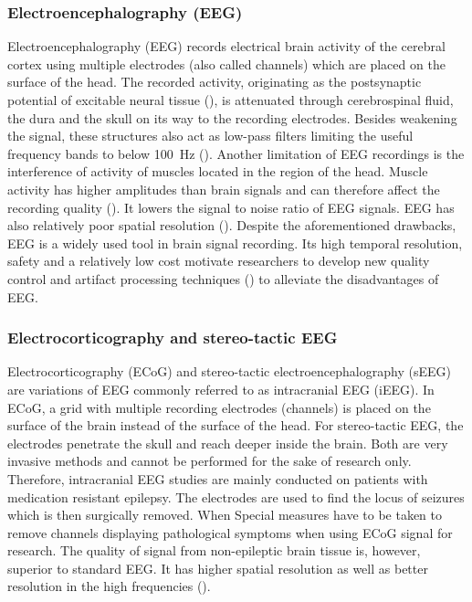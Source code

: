 \subsubsection{Electroencephalography (EEG)}
Electroencephalography (EEG) records electrical brain activity of the cerebral cortex using multiple electrodes (also called channels) which are placed on the surface of the head. The recorded activity, originating as the postsynaptic potential of excitable neural tissue (\cite{buzsaki-origin-2012}), is attenuated through cerebrospinal fluid, the dura and the skull on its way to the recording electrodes. Besides weakening the signal, these structures also act as low-pass filters limiting the useful frequency bands to below 100~Hz (\cite{tam-human-2019}). Another limitation of EEG recordings is the interference of activity of muscles located in the region of the head. Muscle activity has higher amplitudes than brain signals and can therefore affect the recording quality (\cite{scholg-presence-2002}). It lowers the signal to noise ratio of EEG signals. EEG has also relatively poor spatial resolution (\cite{buzsaki-origin-2012}). Despite the aforementioned drawbacks, EEG is a widely used tool in brain signal recording. Its high temporal resolution, safety and a relatively low cost motivate researchers to develop new quality control and artifact processing techniques (\cite{lotte2018review}) to alleviate the disadvantages of EEG. 

\subsubsection{Electrocorticography and stereo-tactic EEG}
Electrocorticography (ECoG) and stereo-tactic electroencephalography (sEEG) are variations of EEG commonly referred to as intracranial EEG (iEEG).
In ECoG, a grid with multiple recording electrodes (channels) is placed on the surface of the brain instead of the surface of the head.
For stereo-tactic EEG, the electrodes penetrate the skull and reach deeper inside the brain. Both are very invasive methods and cannot be performed for the sake of research only.
Therefore, intracranial EEG studies are mainly conducted on patients with medication resistant epilepsy.
The electrodes are used to find the locus of seizures which is then surgically removed. When Special measures have to be taken to remove channels displaying pathological symptoms when using ECoG signal for research.
The quality of signal from non-epileptic brain tissue is, however, superior to standard EEG. It has higher spatial resolution as well as better resolution in the high frequencies (\cite{volkova-review}).

